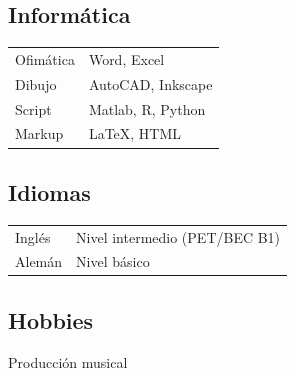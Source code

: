 \documentclass[12pt]{article}
\begin{document}
	\subsection*{Informática}

	\begin{tabular}{ll}

	Ofimática & Word, Excel \\ 
	Dibujo &  AutoCAD, Inkscape \\
	Script & Matlab, R, Python \\
	Markup & \LaTeX, HTML \\ 


	\end{tabular}
	

	\subsection*{Idiomas}
		\begin{tabular}{ll}
			Inglés & Nivel intermedio (PET/BEC B1) \\
			Alemán & Nivel básico \\
		\end{tabular}	
	\subsection*{Hobbies}
		Producción musical


\end{document}
